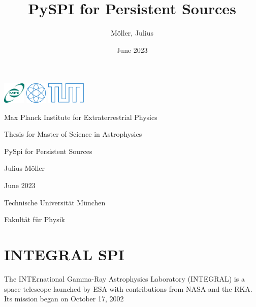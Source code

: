 \documentclass{article}
\title{PySPI for Persistent Sources}
\author{Möller, Julius}
\date{June 2023}
\begin{document}
\begin{titlepage}
    
    \includegraphics[height=1cm]{Images/General/MPE_logo_189x180px.jpg}
    \hfill
    \includegraphics[height=1cm]{Images/General/PH.pdf}
    \includegraphics[height=1cm]{Images/General/tumlogo.pdf}

    \begin{center}
        \vspace{1cm}
        \large

        Max Planck Institute for Extraterrestrial Physics
        

        \vspace{2cm}
        \large
        Thesis for Master of Science in Astrophysics
        
        \vspace{3cm}
        \Huge
        PySpi for Persistent Sources
        
        \vspace{3cm}
        
        \LARGE
        Julius Möller
        
        \vspace{2cm}
        \large
        June 2023
        
        
        \vspace{7cm}
        
        
        
        \large
        Technische Universität München

        Fakultät für Physik
        
        
        
    \end{center}
\end{titlepage}


\tableofcontents

\pagebreak

\section{INTEGRAL SPI}
The INTErnational Gamma-Ray Astrophysics Laboratory (INTEGRAL) is a space telescope launched by ESA with contributions from NASA and the RKA. Its mission began on October 17, 2002

\pagebreak

\nocite{*}
\printbibliography
\end{document}
